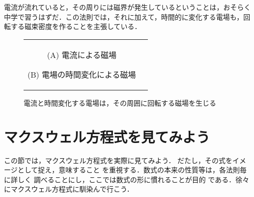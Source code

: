         電流が流れていると，その周りには磁界が発生しているということは，おそらく
        中学で習うはずだ．この法則では，それに加えて，時間的に変化する電場も，回
        転する磁束密度を作ることを主張している．
                \begin{figure}[hbt]
                    \begin{tabular}{cc}
                        \begin{minipage}{0.5\hsize}
                            \begin{center}
                                {AMLaw_Image00.pdf}

                                (A) 電流による磁場
                            \end{center}
                        \end{minipage}
                        \begin{minipage}{0.5\hsize}
                            \begin{center}
                                {AMLaw_Image01.pdf}

                                (B) 電場の時間変化による磁場
                            \end{center}
                        \end{minipage}
                    \end{tabular}
                        \caption{電流と時間変化する電場は，その周囲に回転する磁場を生じる}
                        \label{fig:AMLaw_Image00}
                \end{figure}

    \section{マクスウェル方程式を見てみよう}
        \begin{mycomment}
            この節では，マクスウェル方程式を実際に見てみよう．
            だたし，その式をイメージとして捉え，意味すること
            を重視する．数式の本来の性質等は，各法則毎に詳しく
            調べることにし，ここでは数式の形に慣れることが目的
            である．徐々にマクスウェル方程式に馴染んで行こう．
        \end{mycomment}

